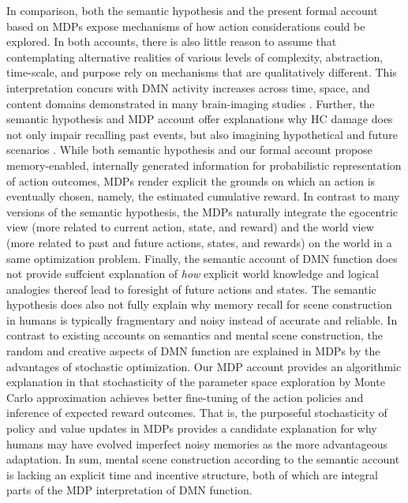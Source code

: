 \documentclass[10pt,letterpaper]{article}
\begin{document}
In comparison,
both the semantic hypothesis and the present formal account based on MDPs
expose mechanisms of how action considerations could be explored.
In both accounts,
there is also little reason to assume that contemplating alternative realities of various
levels of complexity, abstraction, time-scale, and purpose
rely on mechanisms that are qualitatively different. This interpretation concurs with
DMN activity increases across time, space, and content domains
demonstrated in many brain-imaging studies
\citep{spreng2009common, laird2009, bzdok2012morality, binder2009}.
Further, the semantic hypothesis
and MDP account offer explanations why HC damage does
not only impair recalling past events, but also imagining hypothetical and future
scenarios \citep{hassabis2007patients}.
While both semantic hypothesis and
our formal account propose memory-enabled, internally
generated information for probabilistic representation of action outcomes,
MDPs render explicit the grounds on which an action is
eventually chosen, namely, the estimated cumulative reward.
In contrast to many versions of the semantic hypothesis,
the MDPs naturally integrate the egocentric view
(more related to current action, state, and reward) and the
world view (more related to past and future actions, states, and rewards)
on the world in a same optimization problem.
Finally,
the semantic account of DMN function does not provide
suffcient explanation of \textit{how}
explicit world knowledge and logical analogies thereof
lead to foresight of future actions and states.
The semantic hypothesis does also not fully explain why memory recall
for scene construction in humans is typically fragmentary and noisy
instead of accurate and reliable.
In contrast to existing accounts on semantics and
mental scene construction, the random and creative aspects of DMN function
are explained in MDPs by the advantages of stochastic optimization.
Our MDP account provides an algorithmic explanation in that
stochasticity of the parameter space exploration
by Monte Carlo approximation achieves better fine-tuning of the
action policies and inference of expected reward outcomes.
That is, the purposeful stochasticity of policy and value updates
in MDPs provides a candidate explanation for why humans may
have evolved imperfect noisy memories
as the more advantageous adaptation.
In sum, mental scene construction according to the semantic
account is lacking an explicit time and incentive structure,
both of which are integral parts of the MDP interpretation of DMN function.
\end{document}
